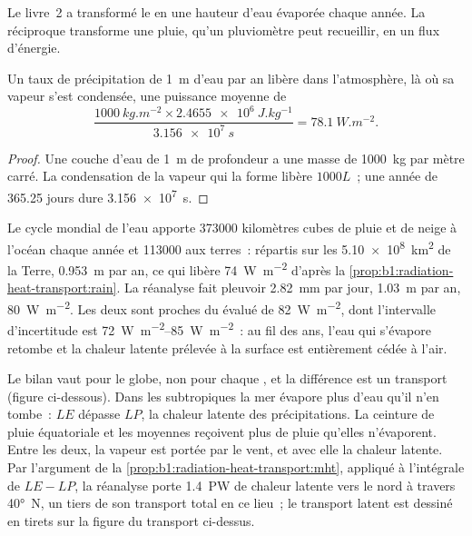 Le livre~2 a transformé le  en une hauteur d'eau évaporée chaque année. La
réciproque transforme une pluie, qu'un pluviomètre peut recueillir, en un flux d'énergie.

\begin{proposition}\label{prop:b1:radiation-heat-transport:rain}
Un taux de précipitation de \qty{1}{m} d'eau par an libère dans l'atmosphère,
là où sa vapeur s'est condensée, une puissance moyenne de
\[
  \frac{\qty{1000}{kg.m^{-2}} \times \qty{2.4655e6}{J.kg^{-1}}}{\qty{3.156e7}{s}}
  = \qty{78.1}{W.m^{-2}} .
\]
\end{proposition}

\begin{proof}
Une couche d'eau de \qty{1}{m} de profondeur a une masse de \qty{1000}{kg} par mètre carré.
La condensation de la vapeur qui la forme libère $1000L$~; une année de \num{365.25} jours
dure \qty{3.156e7}{s}.
\end{proof}

\begin{example}\label{ex:b1:radiation-heat-transport:rain}
Le cycle mondial de l'eau apporte \num{373000} kilomètres cubes de pluie et de neige à
l'océan chaque année et \num{113000} aux terres~: répartis sur les
\qty{5.10e8}{km^2} de la Terre, \qty{0.953}{m} par an, ce qui libère
\qty{74}{W.m^{-2}} d'après la \cref{prop:b1:radiation-heat-transport:rain}. La réanalyse
fait pleuvoir \qty{2.82}{mm} par jour, \qty{1.03}{m} par an, \qty{80}{W.m^{-2}}. Les deux sont proches
du  évalué de \qty{82}{W.m^{-2}}, dont l'intervalle d'incertitude est
\qtyrange{72}{85}{W.m^{-2}}~: au fil des ans, l'eau qui s'évapore retombe
et la chaleur latente prélevée à la surface est entièrement cédée à l'air.
\end{example}

Le bilan vaut pour le globe, non pour chaque , et la différence est un
transport (figure ci-dessous). Dans les subtropiques la mer évapore plus d'eau qu'il
n'en tombe~: $LE$ dépasse $LP$, la chaleur latente des précipitations. La
ceinture de pluie équatoriale et les moyennes  reçoivent plus de pluie qu'elles
n'évaporent. Entre les deux, la vapeur est portée par le vent, et avec elle la
chaleur latente. Par l'argument de la \cref{prop:b1:radiation-heat-transport:mht},
appliqué à l'intégrale de $LE - LP$, la réanalyse porte
\qty{1.4}{PW} de chaleur latente vers le nord à travers \ang{40}~N, un tiers de son transport
total en ce lieu~; le transport latent est dessiné en tirets sur la figure du transport ci-dessus.

